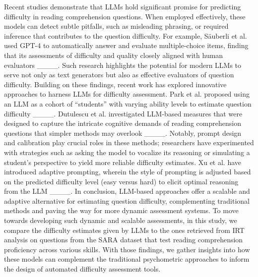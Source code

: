 Recent studies demonstrate that LLMs hold significant promise for predicting difficulty in reading comprehension questions. When employed effectively, these models can detect subtle pitfalls, such as misleading phrasing, or required inference that contributes to the question difficulty. For example, Säuberli et al. used GPT-4 to automatically answer and evaluate multiple-choice items, finding that its assessments of difficulty and quality closely aligned with human evaluators ____. Such research highlights the potential for modern LLMs to serve not only as text generators but also as effective evaluators of question difficulty. Building on these findings, recent work has explored innovative approaches to harness LLMs for difficulty assessment. Park et al. proposed using an LLM as a cohort of ``students'' with varying ability levels to estimate question difficulty ____. Dutulescu et al. investigated LLM-based measures that were designed to capture the intricate cognitive demands of reading comprehension questions that simpler methods may overlook ____. Notably, prompt design and calibration play crucial roles in these methods; researchers have experimented with strategies such as asking the model to vocalize its reasoning or simulating a student's perspective to yield more reliable difficulty estimates. Xu et al. have introduced adaptive prompting, wherein the style of prompting is adjusted based on the predicted difficulty level (easy versus hard) to elicit optimal reasoning from the LLM ____. In conclusion, LLM-based approaches offer a scalable and adaptive alternative for estimating question difficulty, complementing traditional methods and paving the way for more dynamic assessment systems. To move towards developing such dynamic and scalable assessments, in this study, we compare the difficulty estimates given by LLMs to the ones retrieved from IRT analysis on questions from the SARA dataset that test reading comprehension proficiency across various skills. With those findings, we gather insights into how these models can complement the traditional psychometric approaches to inform the design of automated difficulty assessment tools.